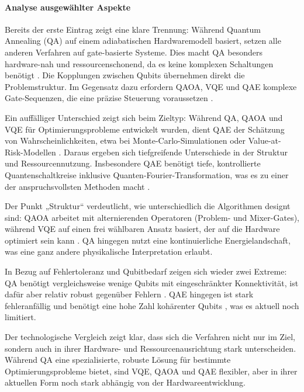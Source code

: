 \paragraph{Analyse ausgewählter Aspekte}

Bereits der erste Eintrag zeigt eine klare Trennung: Während Quantum Annealing (QA) auf einem adiabatischen Hardwaremodell basiert, setzen alle anderen Verfahren auf gate-basierte Systeme. Dies macht QA besonders hardware-nah und ressourcenschonend, da es keine komplexen Schaltungen benötigt \cite{orus_quantum_2019, mugel_dynamic_2022}. Die Kopplungen zwischen Qubits übernehmen direkt die Problemstruktur. Im Gegensatz dazu erfordern QAOA, VQE und QAE komplexe Gate-Sequenzen, die eine präzise Steuerung voraussetzen \cite{buonaiuto_best_2023}.

Ein auffälliger Unterschied zeigt sich beim Zieltyp: Während QA, QAOA und VQE für Optimierungsprobleme entwickelt wurden, dient QAE der Schätzung von Wahrscheinlichkeiten, etwa bei Monte-Carlo-Simulationen oder Value-at-Risk-Modellen \cite{rebentrost_quantum_2018, quantumjournal2020}. Daraus ergeben sich tiefgreifende Unterschiede in der Struktur und Ressourcennutzung. Insbesondere QAE benötigt tiefe, kontrollierte Quantenschaltkreise inklusive Quanten-Fourier-Transformation, was es zu einer der anspruchsvollsten Methoden macht \cite{martin2022}.

Der Punkt „Struktur“ verdeutlicht, wie unterschiedlich die Algorithmen designt sind: QAOA arbeitet mit alternierenden Operatoren (Problem- und Mixer-Gates), während VQE auf einen frei wählbaren Ansatz basiert, der auf die Hardware optimiert sein kann \cite{brandhofer_benchmarking_2022}. QA hingegen nutzt eine kontinuierliche Energielandschaft, was eine ganz andere physikalische Interpretation erlaubt.

In Bezug auf Fehlertoleranz und Qubitbedarf zeigen sich wieder zwei Extreme: QA benötigt vergleichsweise wenige Qubits mit eingeschränkter Konnektivität, ist dafür aber relativ robust gegenüber Fehlern \cite{sakuler_real-world_2025}. QAE hingegen ist stark fehleranfällig und benötigt eine hohe Zahl kohärenter Qubits \cite{bouland_prospects_2020}, was es aktuell noch limitiert.

Der technologische Vergleich zeigt klar, dass sich die Verfahren nicht nur im Ziel, sondern auch in ihrer Hardware- und Ressourcenausrichtung stark unterscheiden. Während QA eine spezialisierte, robuste Lösung für bestimmte Optimierungsprobleme bietet, sind VQE, QAOA und QAE flexibler, aber in ihrer aktuellen Form noch stark abhängig von der Hardwareentwicklung.




